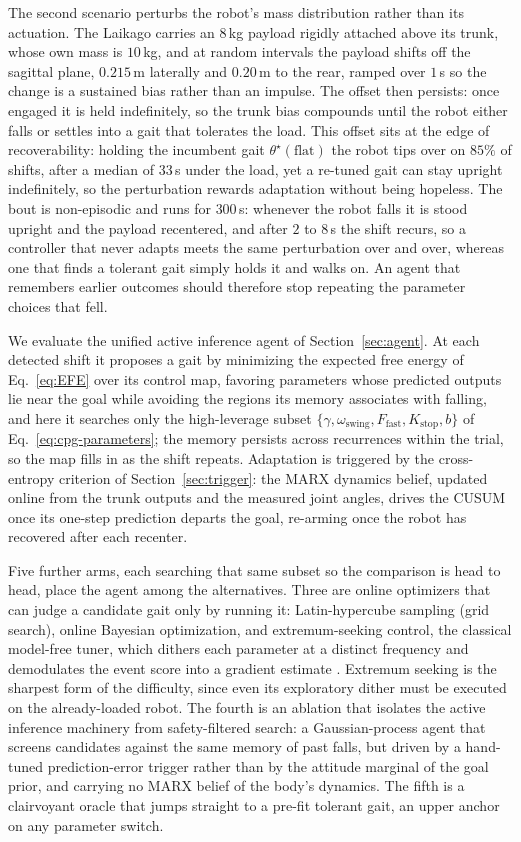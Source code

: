 \documentclass[letterpaper, 10 pt, conference]{ieeeconf}  %
\begin{document}
The second scenario perturbs the robot's mass distribution rather than its actuation.
The Laikago carries an $8$\,kg payload rigidly attached above its trunk, whose own mass is $10$\,kg, and at random intervals the payload shifts off the sagittal plane, $0.215$\,m laterally and $0.20$\,m to the rear, ramped over $1$\,s so the change is a sustained bias rather than an impulse.
The offset then persists: once engaged it is held indefinitely, so the trunk bias compounds until the robot either falls or settles into a gait that tolerates the load.
This offset sits at the edge of recoverability: holding the incumbent gait $\theta^{\star}(\text{flat})$ the robot tips over on $85\%$ of shifts, after a median of $33$\,s under the load, yet a re-tuned gait can stay upright indefinitely, so the perturbation rewards adaptation without being hopeless.
The bout is non-episodic and runs for $300$\,s: whenever the robot falls it is stood upright and the payload recentered, and after $2$ to $8$\,s the shift recurs, so a controller that never adapts meets the same perturbation over and over, whereas one that finds a tolerant gait simply holds it and walks on.
An agent that remembers earlier outcomes should therefore stop repeating the parameter choices that fell.

We evaluate the unified active inference agent of Section~\ref{sec:agent}.
At each detected shift it proposes a gait by minimizing the expected free energy of Eq.~\ref{eq:EFE} over its control map, favoring parameters whose predicted outputs lie near the goal while avoiding the regions its memory associates with falling, and here it searches only the high-leverage subset $\{\gamma, \omega_{\text{swing}}, F_{\text{fast}}, K_{\text{stop}}, b\}$ of Eq.~\ref{eq:cpg-parameters}; the memory persists across recurrences within the trial, so the map fills in as the shift repeats.
Adaptation is triggered by the cross-entropy criterion of Section~\ref{sec:trigger}: the MARX dynamics belief, updated online from the trunk outputs and the measured joint angles, drives the CUSUM once its one-step prediction departs the goal, re-arming once the robot has recovered after each recenter.

Five further arms, each searching that same subset so the comparison is head to head, place the agent among the alternatives.
Three are online optimizers that can judge a candidate gait only by running it: Latin-hypercube sampling (grid search), online Bayesian optimization, and extremum-seeking control, the classical model-free tuner, which dithers each parameter at a distinct frequency and demodulates the event score into a gradient estimate \cite{killingsworth2006extremum}.
Extremum seeking is the sharpest form of the difficulty, since even its exploratory dither must be executed on the already-loaded robot.
The fourth is an ablation that isolates the active inference machinery from safety-filtered search: a Gaussian-process agent that screens candidates against the same memory of past falls, but driven by a hand-tuned prediction-error trigger rather than by the attitude marginal of the goal prior, and carrying no MARX belief of the body's dynamics.
The fifth is a clairvoyant oracle that jumps straight to a pre-fit tolerant gait, an upper anchor on any parameter switch.
\end{document}
